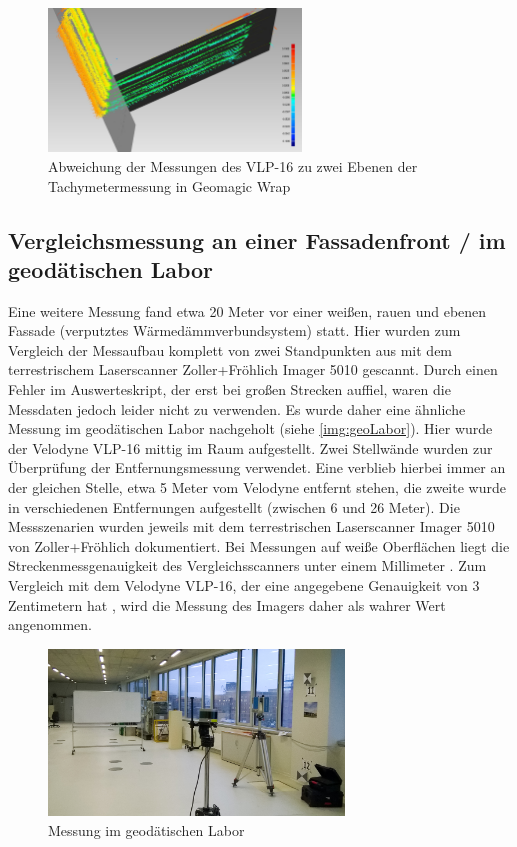 \documentclass[a4paper,12pt,bibliography=totoc, listof=totoc,titlepage,pointlessnumbers]{scrreprt}
\begin{document}
\begin{figure}[!ht]
 \centering
 \includegraphics[width=0.60\textwidth]{./img/pfeiler.jpg}
 \caption{Abweichung der Messungen des VLP-16 zu zwei Ebenen der Tachymetermessung in Geomagic Wrap}
 \label{img:pfeiler}
\end{figure}

\subsection{Vergleichsmessung an einer Fassadenfront / im geodätischen Labor}
Eine weitere Messung fand etwa 20 Meter vor einer weißen, rauen und ebenen Fassade (verputztes Wärmedämmverbundsystem) statt. Hier wurden zum Vergleich der Messaufbau komplett von zwei Standpunkten aus mit dem terrestrischem Laser\-scan\-ner Zoller+Fröhlich Imager 5010 gescannt. Durch einen Fehler im Auswerteskript, der erst bei großen Strecken auffiel, waren die Messdaten jedoch leider nicht zu verwenden. Es wurde daher eine ähnliche Messung im geodätischen Labor nachgeholt (siehe \autoref{img:geoLabor}).
Hier wurde der Velodyne VLP-16 mittig im Raum aufgestellt. Zwei Stellwände wurden zur Überprüfung der Entfernungsmessung verwendet. Eine verblieb hierbei immer an der gleichen Stelle, etwa 5 Meter vom Velodyne entfernt stehen, die zweite wurde in verschiedenen Entfernungen aufgestellt (zwischen 6 und 26 Meter). Die Messszenarien wurden jeweils mit dem terrestrischen Laser\-scan\-ner Imager 5010 von Zoller+Fröhlich dokumentiert. Bei Messungen auf weiße Oberflächen liegt die Streckenmessgenauigkeit des Vergleichsscanners unter einem Millimeter \citep{imager5010}. Zum Vergleich mit dem Velodyne VLP-16, der eine angegebene Genauigkeit von 3 Zentimetern hat \citep{vlpSheet}, wird die Messung des Imagers daher als wahrer Wert angenommen.

\begin{figure}[!ht]
 \centering
 \includegraphics[width=0.7\textwidth]{./img/geoLabor.jpg}
 \caption{Messung im geodätischen Labor}
 \label{img:geoLabor}
\end{figure}
\end{document}
